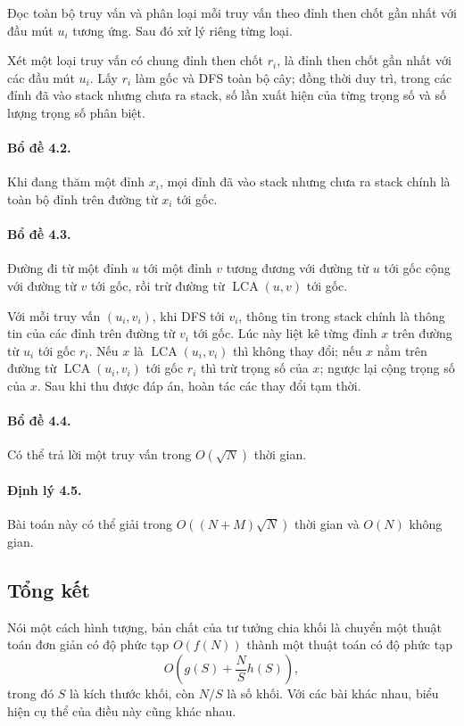 \documentclass[11pt]{article}
\begin{document}
Đọc toàn bộ truy vấn và phân loại mỗi truy vấn theo đỉnh then chốt gần nhất
với đầu mút \(u_i\) tương ứng. Sau đó xử lý riêng từng loại.

Xét một loại truy vấn có chung đỉnh then chốt \(r_i\), là đỉnh then chốt gần
nhất với các đầu mút \(u_i\). Lấy \(r_i\) làm gốc và DFS toàn bộ cây; đồng
thời duy trì, trong các đỉnh đã vào stack nhưng chưa ra stack, số lần xuất
hiện của từng trọng số và số lượng trọng số phân biệt.

\paragraph{Bổ đề 4.2.}
Khi đang thăm một đỉnh \(x_i\), mọi đỉnh đã vào stack nhưng chưa ra stack
chính là toàn bộ đỉnh trên đường từ \(x_i\) tới gốc.

\paragraph{Bổ đề 4.3.}
Đường đi từ một đỉnh \(u\) tới một đỉnh \(v\) tương đương với đường từ \(u\)
tới gốc cộng với đường từ \(v\) tới gốc, rồi trừ đường từ
\(\operatorname{LCA}(u,v)\) tới gốc.

Với mỗi truy vấn \((u_i,v_i)\), khi DFS tới \(v_i\), thông tin trong stack
chính là thông tin của các đỉnh trên đường từ \(v_i\) tới gốc. Lúc này liệt
kê từng đỉnh \(x\) trên đường từ \(u_i\) tới gốc \(r_i\). Nếu \(x\) là
\(\operatorname{LCA}(u_i,v_i)\) thì không thay đổi; nếu \(x\) nằm trên đường
từ \(\operatorname{LCA}(u_i,v_i)\) tới gốc \(r_i\) thì trừ trọng số của
\(x\); ngược lại cộng trọng số của \(x\). Sau khi thu được đáp án, hoàn tác
các thay đổi tạm thời.

\paragraph{Bổ đề 4.4.}
Có thể trả lời một truy vấn trong \(O(\sqrt N)\) thời gian.

\paragraph{Định lý 4.5.}
Bài toán này có thể giải trong \(O((N+M)\sqrt N)\) thời gian và \(O(N)\)
không gian.

\subsection{Tổng kết}

Nói một cách hình tượng, bản chất của tư tưởng chia khối là chuyển một thuật
toán đơn giản có độ phức tạp \(O(f(N))\) thành một thuật toán có độ phức tạp
\[
  O\left(g(S)+\frac{N}{S}h(S)\right),
\]
trong đó \(S\) là kích thước khối, còn \(N/S\) là số khối. Với các bài khác
nhau, biểu hiện cụ thể của điều này cũng khác nhau.
\end{document}
